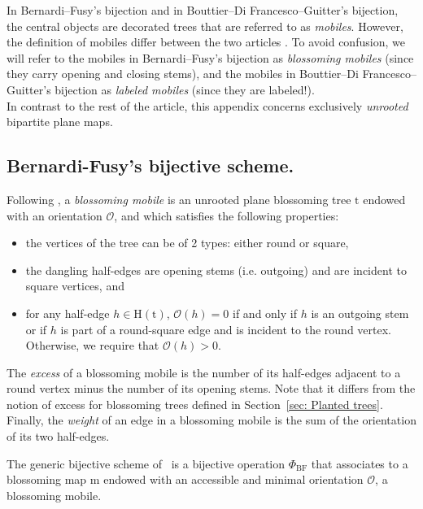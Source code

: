 \documentclass[11pt,reqno,tbtags]{amsart}
\renewcommand{\rm}{\mathrm{m}}
\newcommand{\rt}{\mathrm{t}}
\numberwithin{equation}{section}
\numberwithin{theo}{section}
\theoremstyle{definition}
\newcommand{\cO}{\mathcal{O}}
\begin{document}
In Bernardi--Fusy's bijection and in Bouttier--Di Francesco--Guitter's bijection, the central objects are decorated trees that are referred to as \emph{mobiles}.  However, the definition of mobiles differ between the two articles \cite{BernardiFusy_TrigQuadPent, BouttierDiFrancescoGuitter_Mobiles}. To avoid confusion, we will refer to the mobiles in Bernardi--Fusy’s bijection as \emph{blossoming mobiles} (since they carry opening and closing stems), and the mobiles in Bouttier--Di Francesco--Guitter’s bijection as \emph{labeled mobiles} (since they are labeled!).\\

In contrast to the rest of the article, this appendix concerns exclusively \emph{unrooted} bipartite plane maps.

\subsection{Bernardi-Fusy's bijective scheme.}

Following \cite{BernardiFusy_TrigQuadPent}, a \emph{blossoming mobile} is an unrooted plane blossoming tree $\rt$ endowed with an orientation $\cO$, and which satisfies the following properties: 
\begin{itemize}
	\item the vertices of the tree can be of 2 types: either round or square, 
	\item the dangling half-edges are opening stems (i.e. outgoing) and are incident to square vertices, and
	\item for any half-edge $h\in \mathrm{H}(\rt)$, $\cO(h)=0$ if and only if $h$ is an outgoing stem or if $h$ is part of a round-square edge and is incident to the round vertex. Otherwise, we require that $\cO(h)>0$.
\end{itemize}

The \emph{excess} of a blossoming mobile is the number of its half-edges adjacent to a round vertex minus the number of its opening stems. Note that it differs from the notion of excess for blossoming trees  defined in Section~\ref{sec: Planted trees}. Finally, the \emph{weight} of an edge in a blossoming mobile is the sum of the orientation of its two half-edges.\medskip

The generic bijective scheme of~\cite{BernardiFusy_TrigQuadPent} is a bijective operation $\Phi_{\mathrm{BF}}$ that associates to a blossoming map $\rm$ endowed with an accessible and minimal orientation $\cO$, a blossoming mobile. 
\end{document}
